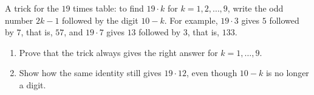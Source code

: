 A trick for the $19$ times table: to find $19\cdot k$ for $k=1,2,\dots,9$, write the odd number $2k-1$ followed by the digit $10-k$. For example, $19\cdot3$ gives $5$ followed by $7$, that is, $57$, and $19\cdot7$ gives $13$ followed by $3$, that is, $133$.
\begin{enumerate}
\item[(a)] Prove that the trick always gives the right answer for $k=1,\dots,9$.
\item[(b)] Show how the same identity still gives $19\cdot12$, even though $10-k$ is no longer a digit.
\end{enumerate}
